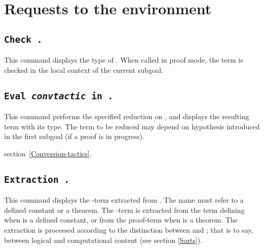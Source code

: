 \section{Requests to the environment}

\subsection{\tt Check {\term}.}
\label{Check}
This command displays the type of {\term}. When called in proof mode, 
the term is checked in the local context of the current subgoal.


\subsection{\tt Eval {\rm\sl convtactic} in {\term}.}

This command performs the specified reduction on {\term}, and displays
the resulting term with its type. The term to be reduced may depend on
hypothesis introduced in the first subgoal (if a proof is in
progress).


\SeeAlso section~\ref{Conversion-tactics}.

\subsection{\tt Extraction \ident.}
\label{ExtractionIdent}
This command displays the \FW-term extracted from {\ident}. The name
{\ident} must refer to a defined constant or a theorem. The \FW-term
is extracted from the term defining {\ident} when {\ident} is a
defined constant, or from the proof-term when {\ident} is a
theorem. The extraction is processed according to the distinction
between {\Set} and {\Prop}; that is to say, between logical and
computational content (see section \ref{Sorts}).

